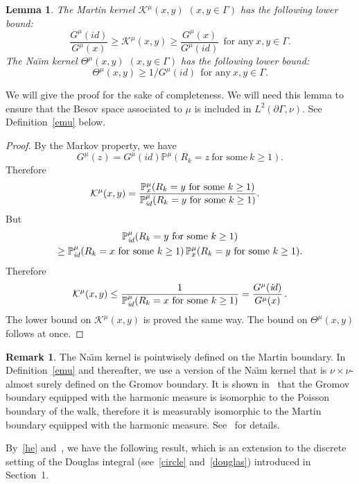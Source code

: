 \documentclass[10pt]{amsart}
\newtheorem{lemm}[theo]{Lemma}\newtheorem{prop}[theo]{Proposition}\newtheorem{coro}[theo]{Corollary}\newtheorem{conj}[theo]{Conjecture}
\theoremstyle{definition}\newtheorem{defi}[theo]{Definition}\newtheorem{rema}[theo]{Remark}\newtheorem{exam}[theo]{Example}\newtheorem{exem}[theo]{Example}\newtheorem{nota}[theo]{Notation}
\newcommand{\ck}{\mathcal{K}}
\newcommand{\bp}{\mathbb{P}}
\begin{document}
\begin{lemm}\label{LB-naim}
The Martin kernel $\ck^{\mu}(x,y)$ $(x,y\in\Gamma)$ has the following lower bound:
\[
\frac {G^\mu(id)}{G^\mu(x)}\geq\ck^\mu(x,y)\geq \frac{G^\mu(x)}{G^\mu(\textit{id})}\ \ \text{for\ any}\ x,y\in\Gamma.
\]
The Na{\"\i}m kernel $\Theta^{\mu}(x,y)$ $(x,y\in\Gamma)$ has the following lower bound:
\[
\Theta^{\mu}(x,y)\geq 1/G^{\mu}(\textit{id})\ \ \text{for\ any}\ x,y\in\Gamma.
\]
\end{lemm}
We will give the proof for the sake of completeness. We will need this lemma to ensure that the Besov space associated to $\mu$ is included in $L^2(\partial\Gamma,\nu)$. See Definition~\ref{emu} below.

\begin{proof}
By the Markov property, we have
\[
G^{\mu}(z)=G^{\mu}(\textit{id})\bp^{\mu}(R_k=z\ \text{for\ some}\ k\geq1).
\]
Therefore
\begin{align*}
& \ck^\mu(x,y)=\frac{ \bp^{\mu}_{x}(R_k={y}\ \text{for\ some}\ k\geq1)} {\bp^{\mu}_{\textit id}(R_k={y}\ \text{for\ some}\ k\geq1)}.
\end{align*}
But
\begin{multline*}
\bp^{\mu}_{\textit id}(R_k={y}\ \text{for\ some}\ k\geq1)\\
\geq \bp^{\mu}_{\textit id}(R_k={x}\ \text{for\ some}\ k\geq1)\, \bp^{\mu}_{x}(R_k={y}\ \text{for\ some}\ k\geq1).
\end{multline*}
Therefore
\[
\ck^\mu(x,y)\leq \frac 1{\bp^{\mu}_{\textit id}(R_k={x}\ \text{for\ some}\ k\geq1)} = \frac{G^\mu({\textit id})}{G^\mu(x)}\,.
\]
The lower bound on $\ck^\mu(x,y)$ is proved the same way. The bound on $ \Theta^{\mu}(x,y)$ follows at once.
\end{proof}

\begin{rema}
The Na{\"\i}m kernel is pointwisely defined on the Martin boundary. In Definition~\ref{emu} and thereafter, we use a version of the Na{\"\i}m
kernel that is $\nu\times\nu$-almost surely defined on the Gromov boundary. It is shown in~\cite{Ka} that the Gromov boundary equipped with the harmonic measure is isomorphic to the Poisson boundary of the walk, therefore it is measurably isomorphic to the Martin boundary equipped with the harmonic measure. See~\cite[Chapter~VI]{Woe} for details.
\end{rema}

By~\eqref{he} and~\cite[Theorem~3,5]{Sil}, we have the following result, which is an extension to the discrete setting of the Douglas integral (see~\eqref{circle} and~\eqref{douglas}) introduced in Section~1.
\end{document}
